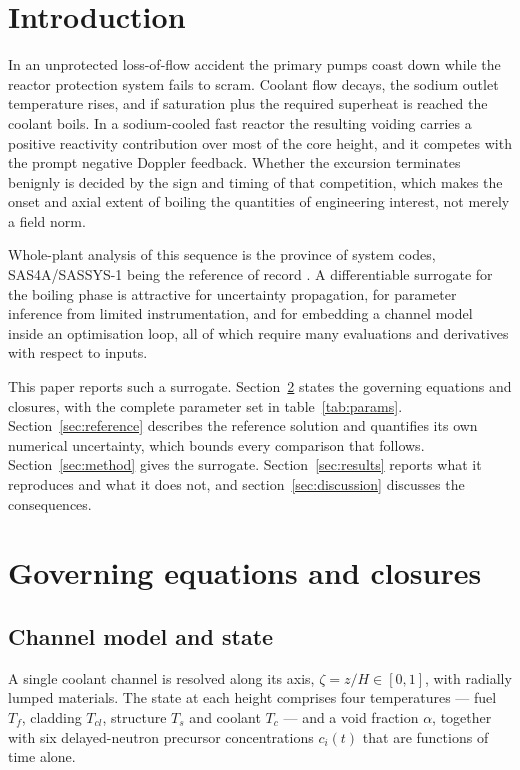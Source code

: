 \documentclass[11pt,a4paper]{article}
\begin{document}
\vspace{10mm}

\section{Introduction}

In an unprotected loss-of-flow accident the primary pumps coast down while the reactor
protection system fails to scram. Coolant flow decays, the sodium outlet temperature rises,
and if saturation plus the required superheat is reached the coolant boils. In a
sodium-cooled fast reactor the resulting voiding carries a positive reactivity contribution
over most of the core height, and it competes with the prompt negative Doppler feedback.
Whether the excursion terminates benignly is decided by the sign and timing of that
competition, which makes the onset and axial extent of boiling the quantities of
engineering interest, not merely a field norm.

Whole-plant analysis of this sequence is the province of system codes, SAS4A/SASSYS-1 being
the reference of record \cite{sas4a}. A differentiable surrogate for the boiling phase is
attractive for uncertainty propagation, for parameter inference from limited
instrumentation, and for embedding a channel model inside an optimisation loop, all of
which require many evaluations and derivatives with respect to inputs.

This paper reports such a surrogate. Section~\ref{sec:model} states the governing equations
and closures, with the complete parameter set in table~\ref{tab:params}.
Section~\ref{sec:reference} describes the reference solution and quantifies its own
numerical uncertainty, which bounds every comparison that follows. Section~\ref{sec:method}
gives the surrogate. Section~\ref{sec:results} reports what it reproduces and what it does
not, and section~\ref{sec:discussion} discusses the consequences.

\section{Governing equations and closures}\label{sec:model}

\subsection{Channel model and state}

A single coolant channel is resolved along its axis, $\zeta = z/H \in [0,1]$, with radially
lumped materials. The state at each height comprises four temperatures --- fuel $T_f$,
cladding $T_{cl}$, structure $T_s$ and coolant $T_c$ --- and a void fraction $\alpha$,
together with six delayed-neutron precursor concentrations $c_i(t)$ that are functions of
time alone.
\end{document}
